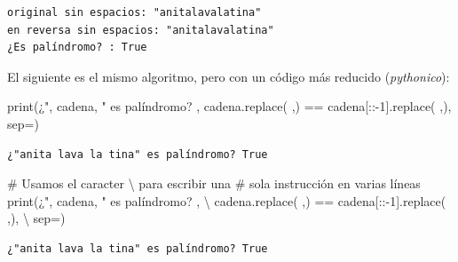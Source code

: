 \documentclass[
  spanish,
  letterpaper,
]{scrbook}
\newenvironment{Shaded}{\begin{snugshade}}{\end{snugshade}}
\newcommand{\BuiltInTok}[1]{\textcolor[rgb]{0.00,0.23,0.31}{#1}}
\newcommand{\CommentTok}[1]{\textcolor[rgb]{0.37,0.37,0.37}{#1}}
\newcommand{\DecValTok}[1]{\textcolor[rgb]{0.68,0.00,0.00}{#1}}
\newcommand{\NormalTok}[1]{\textcolor[rgb]{0.00,0.23,0.31}{#1}}
\newcommand{\OperatorTok}[1]{\textcolor[rgb]{0.37,0.37,0.37}{#1}}
\newcommand{\StringTok}[1]{\textcolor[rgb]{0.13,0.47,0.30}{#1}}
\theoremstyle{definition}
\theoremstyle{remark}
\begin{document}
\begin{verbatim}
original sin espacios: "anitalavalatina"
en reversa sin espacios: "anitalavalatina"
¿Es palíndromo? : True
\end{verbatim}

El siguiente es el mismo algoritmo, pero con un código más reducido
(\emph{pythonico}):

\begin{Shaded}
\begin{Highlighting}[]
\BuiltInTok{print}\NormalTok{(}\StringTok{\textquotesingle{}¿"\textquotesingle{}}\NormalTok{, cadena, }\StringTok{\textquotesingle{}" es palíndromo? \textquotesingle{}}\NormalTok{, cadena.replace(}\StringTok{\textquotesingle{} \textquotesingle{}}\NormalTok{,}\StringTok{\textquotesingle{}\textquotesingle{}}\NormalTok{) }\OperatorTok{==}\NormalTok{ cadena[::}\OperatorTok{{-}}\DecValTok{1}\NormalTok{].replace(}\StringTok{\textquotesingle{} \textquotesingle{}}\NormalTok{,}\StringTok{\textquotesingle{}\textquotesingle{}}\NormalTok{), sep}\OperatorTok{=}\StringTok{\textquotesingle{}\textquotesingle{}}\NormalTok{)}
\end{Highlighting}
\end{Shaded}

\begin{verbatim}
¿"anita lava la tina" es palíndromo? True
\end{verbatim}

\begin{Shaded}
\begin{Highlighting}[]
\CommentTok{\# Usamos el caracter \textbackslash{} para escribir una }
\CommentTok{\# sola instrucción en varias líneas}
\BuiltInTok{print}\NormalTok{(}\StringTok{\textquotesingle{}¿"\textquotesingle{}}\NormalTok{, cadena, }\StringTok{\textquotesingle{}" es palíndromo? \textquotesingle{}}\NormalTok{, }\OperatorTok{\textbackslash{}}
\NormalTok{      cadena.replace(}\StringTok{\textquotesingle{} \textquotesingle{}}\NormalTok{,}\StringTok{\textquotesingle{}\textquotesingle{}}\NormalTok{) }\OperatorTok{==}\NormalTok{ cadena[::}\OperatorTok{{-}}\DecValTok{1}\NormalTok{].replace(}\StringTok{\textquotesingle{} \textquotesingle{}}\NormalTok{,}\StringTok{\textquotesingle{}\textquotesingle{}}\NormalTok{), }\OperatorTok{\textbackslash{}}
\NormalTok{      sep}\OperatorTok{=}\StringTok{\textquotesingle{}\textquotesingle{}}\NormalTok{)}
\end{Highlighting}
\end{Shaded}

\begin{verbatim}
¿"anita lava la tina" es palíndromo? True
\end{verbatim}
\end{document}
